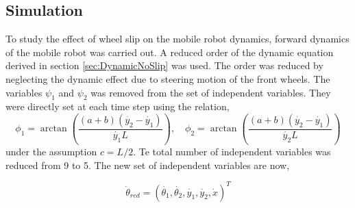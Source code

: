{\subsection{Simulation}
To study the effect of wheel slip on the mobile robot dynamics, forward dynamics of the mobile robot was carried out. 
A reduced order  of the dynamic  equation derived in section \ref{sec:DynamicNoSlip} was used.
 The order was reduced by  neglecting the dynamic effect due to steering motion of the front wheels. The  variables $\psi_1$ and $\psi_2$ was  removed  from the  set of independent variables. They were directly set  at each time step using the relation,
 \[\phi_1=\arctan\left( \frac{(a+b)(\dot{y_2}-\dot{y_1})}{\dot{y_1}L}\right) , \quad
 \phi_2=\arctan\left( \frac{(a+b)(\dot{y_2}-\dot{y_1})}{\dot{y_2}L  }\right) 
 \]
  under the assumption $c=L/2$.
Te total number of independent variables  was  reduced from  9 to 5. The new set of independent variables are now,

\begin{equation}
\label{eqn:theta_slip_reduced}
\dot{\theta}_{red}=(\dot{\theta_1},\dot{\theta_2}, \dot{y_1},\dot{y_2},\dot{x})^T
\end{equation} 

}

